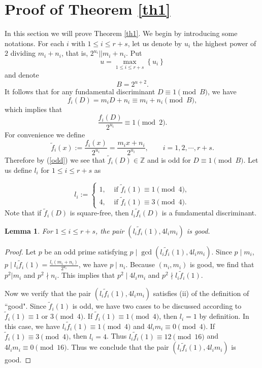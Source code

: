 \documentclass{amsart}
\newtheorem{lemma}[theorem]{Lemma}
\begin{document}
\section{Proof of Theorem \ref{th1}}
In this section we will prove  Theorem \ref{th1}. We begin by introducing some notations.
For each $i$ with $1 \le i \le r+s$, let us denote  by $u_{i}$   the highest power of $2$ dividing $m_i+n_i$, that is, $2^{u_i}||m_{i}+n_{i}$.  Put \[u=\max _{1 \le i \le r+s}\left\{u_{i}\right\}\] and denote \[B=2^{u+2}.\] It follows that for any fundamental discriminant  $D \equiv 1\pmod B$,
we have
\[f_i(D)=m_iD+n_i\equiv m_i+n_i\pmod B,\]
which implies that
\begin{equation}\label{odd}\frac{f_i(D)}{2^{u_i}}\equiv1\pmod2.\end{equation}
For convenience we define
\[
\widetilde{f}_{i}(x):=\frac{f_{i}(x)}{2^{u_{i}}}=\frac{m_{i} x+n_{i}}{2^{u_{i}}},\qquad i=1, 2, \cdots, r+s.
\]
Therefore by (\ref{odd}) we see that $\widetilde{f}_{i}(D)\in \mathbb{Z}$ and is odd for $D\equiv1\pmod B$. Let us  define $l_i$ for $1\le i\le r+s$ as

\[
l_{i}:= \begin{cases}1, & \text { if } \widetilde{f}_{i}(1) \equiv 1 \pmod 4 , \\ 4, & \text { if } \widetilde{f}_{i}(1) \equiv 3  \pmod 4.\end{cases}
\]
Note that if  $\widetilde{f}_{i}(D)$ is square-free, then $l_{i} \widetilde{f}_{i}(D)$ is a fundamental discriminant.

\begin{lemma}\label{good}
For $1\le i \le r+s$, the pair $( l_{i} \widetilde{f}_{i}(1), 4l_{i} m_{i})$ is good.
\end{lemma}

\begin{proof}
Let $p$ be an odd prime satisfying $p\mid\operatorname{gcd}(l_{i} \widetilde{f}_{i}(1), 4 l_{i} m_{i})$. Since $p\mid m_i$, $p\mid l_{i}\widetilde{f}_{i}(1)=\frac{l_i(m_i+n_i)}{2^{u_i}}$, we have $p\mid n_i$. Because $(n_i,m_i)$ is good, we find that $p^2|m_i$ and $p^2\nmid n_i$. This implies  that $p^2\mid 4l_im_i$ and $p^2\nmid l_{i}\widetilde{f}_{i}(1)$.

Now we verify that the pair $(l_{i} \widetilde{f}_{i}(1), 4 l_{i} m_{i})$ satisfies (ii) of the definition of ``good".  Since $\widetilde{f}_{i}(1)$ is odd, we have two cases to be discussed according to $\widetilde{f}_{i}(1) \equiv 1 \text{ or }3\pmod4$. If $\widetilde{f}_{i}(1) \equiv 1\pmod 4 $, then $l_{i}=1$ by definition. In this case, we have $l_{i} \widetilde{f}_{i}(1) \equiv 1\pmod 4$ and $4 l_{i} m_{i} \equiv 0\pmod 4$. If $\widetilde{f}_{i}(1) \equiv 3\pmod 4$, then $l_{i}=4$. Thus $l_{i} \widetilde{f}_{i}(1) \equiv 12\pmod{ 16} $ and $4 l_{i} m_{i} \equiv 0\pmod{ 16}$. Thus we conclude that the pair $(l_{i} \widetilde{f}_{i}(1), 4 l_{i} m_{i})$ is good.

\end{proof}
\end{document}
